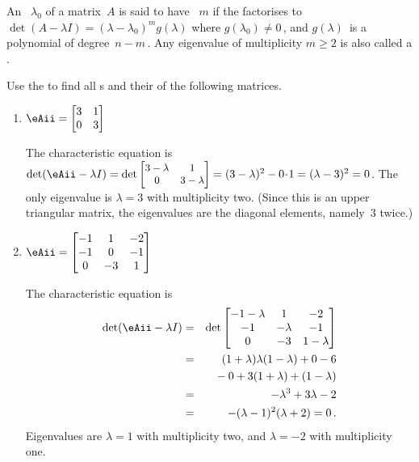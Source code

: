 \begin{definition} \label{def:eigmult}
An ~\(\lambda_0\) of a matrix~\(A\) is said to have ~\(m\) if the  factorises to \(\det(A-\lambda I)=(\lambda-\lambda_0)^mg(\lambda)\) where \(g(\lambda_0)\neq0\)\,, and \(g(\lambda)\)~is a polynomial of degree~\(n-m\)\,.
Any eigenvalue of multiplicity \(m\geq2\) is also called a .
\end{definition}



\begin{example} \label{eg:faem}
Use the  to find all s and their  of the following matrices.
\begin{enumerate}
\item\label{eg:faem:a} \(\eAii=\begin{bmatrix} 3&1\\0&3 \end{bmatrix}\)
\begin{solution}The characteristic equation is \(\det(\eAii-\lambda I)
=\det{\small\begin{bmatrix} 3-\lambda&1\\0&3-\lambda \end{bmatrix}}
=(3-\lambda)^2-0\cdot1=(\lambda-3)^2=0\). 
The only eigenvalue is \(\lambda=3\) with multiplicity two.
(Since this is an upper triangular matrix, the eigenvalues are the diagonal elements, namely~\(3\) twice.)
\end{solution}

\item\label{eg:faem:b} \(\eAii=\begin{bmatrix}-1&1&-2
\\-1&0&-1
\\0&-3&1 \end{bmatrix}\)
\begin{solution}The characteristic equation is 
\begin{eqnarray*}
\det(\eAii-\lambda I)
&=&\det\begin{bmatrix}-1-\lambda&1&-2
\\-1&-\lambda&-1
\\0&-3&1-\lambda\end{bmatrix}
\\&=&(1+\lambda)\lambda(1-\lambda)+0-6
\\&&{}
-0+3(1+\lambda)+(1-\lambda)
\\&=&-\lambda^3+3\lambda-2
\\&=&-(\lambda-1)^2(\lambda+2)=0\,.
\end{eqnarray*}
Eigenvalues are \(\lambda=1\) with multiplicity two, and \(\lambda=-2\) with multiplicity one.
\end{solution}



\end{enumerate}
\end{example}
